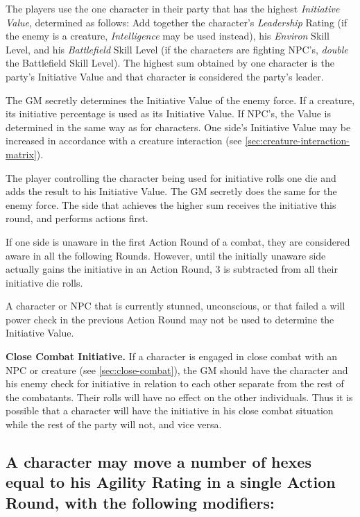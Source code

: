 The players use the one character in their party that has the highest
\emph{Initiative Value}, determined as follows: Add together the
character's \emph{Leadership} Rating (if the enemy is a creature,
\emph{Intelligence} may be used instead), his \emph{Environ} Skill
Level, and his \emph{Battlefield} Skill Level (if the characters are
fighting NPC's, \emph{double} the Battlefield Skill Level). The
highest sum obtained by one character is the party's Initiative Value
and that character is considered the party's leader.

The GM secretly determines the Initiative Value of the enemy force. If
a creature, its initiative percentage is used as its Initiative Value.
If NPC's, the Value is determined in the same way as for characters.
One side's Initiative Value may be increased in accordance with a
creature interaction (see \ref{sec:creature-interaction-matrix}).

The player controlling the character being used for initiative rolls
one die and adds the result to his Initiative Value. The GM secretly
does the same for the enemy force. The side that achieves the higher
sum receives the initiative this round, and performs actions first.

If one side is unaware in the first Action Round of a combat, they are
considered aware in all the following Rounds. However, until the
initially unaware side actually gains the initiative in an Action
Round, 3 is subtracted from all their initiative die rolls.

A character or NPC that is currently stunned, unconscious, or that
failed a will power check in the previous Action Round may not be used
to determine the Initiative Value.

\textbf{Close Combat Initiative.} If a character is engaged in close
combat with an NPC or creature (see \ref{sec:close-combat}), the GM should
have the character and his enemy check for initiative in relation to
each other separate from the rest of the combatants. Their rolls will
have no effect on the other individuals. Thus it is possible that a
character will have the initiative in his close combat situation while
the rest of the party will not, and vice versa.


\subsection[Action Round Movement]{A character may move a number of
  hexes equal to his Agility Rating in a single Action Round, with the
  following modifiers:}
\label{sec:action-round-movement}

